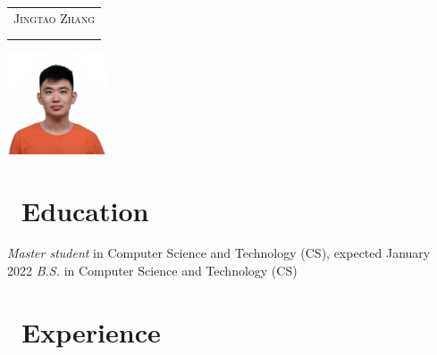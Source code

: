 \documentclass{resume}
\begin{document}

\begin{minipage}{0.7\textwidth}
  \Large{
    \begin{tabu}  { l }
      \scshape{Jingtao Zhang} \\
       \\
       \\
    \end{tabu}
  }
\end{minipage}
\begin{minipage}{0.3\textwidth}
  \raggedleft
  \includegraphics[height=30mm]{avatar}
\end{minipage}

\section{\faGraduationCap\ Education}
\textit{Master student} in Computer Science and Technology (CS), expected January 2022
\textit{B.S.} in  Computer Science and Technology (CS)

\section{\faUsers\ Experience}
\end{document}
